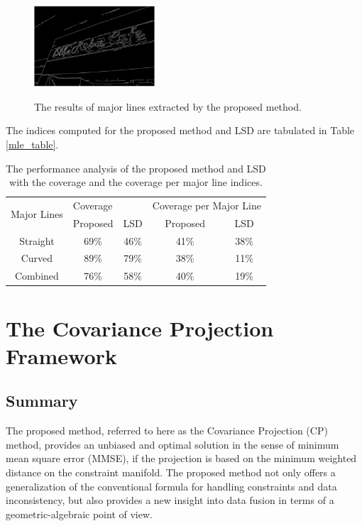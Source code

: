 \documentclass{ieeeaccess}
\begin{document}

\begin{figure}[t!]
\centering
\includegraphics[width=0.4\textwidth]{mle_result_a.png}
\label{mle_result_a}
\caption{The results of major lines extracted by the proposed
method.}
\end{figure}

The indices computed for
the proposed method and LSD are tabulated in Table \ref{mle_table}. 

\begin{table}
\caption{The performance analysis of the proposed method and LSD with
the coverage and the coverage per major line indices.}

\label{mle_table}
\setlength{\tabcolsep}{3pt}
\centering
\begin{tabular}{|c|c|c|c|c|}
\hline
\multirow{2}{*}{Major Lines} & \multicolumn{2}{l|}{Coverage} & \multicolumn{2}{l|}{Coverage per Major Line} \\ \cline{2-5} 
                             & Proposed         & LSD        & Proposed                & LSD                \\ \hline
Straight                     &   69\%               &     46\%       &          41\%               &                   38\% \\ \hline
Curved                      &     89\%         &     79\%     &         38\%            &           11\% \\ \hline
Combined                      &    76\%       &     58\%     &      40\%             &               19\% \\ \hline
\end{tabular}
\label{tab1}
\end{table}

\section{The Covariance Projection Framework}
\subsection{Summary}
The proposed method\cite{cpf}, referred to here as the Covariance Projection (CP) method, provides an
unbiased and optimal solution in the sense of minimum mean square error (MMSE), if the projection
is based on the minimum weighted distance on the constraint manifold. The proposed method
not only offers a generalization of the conventional formula for handling constraints and data
inconsistency, but also provides a new insight into data fusion in terms of a geometric-algebraic
point of view.
\end{document}
